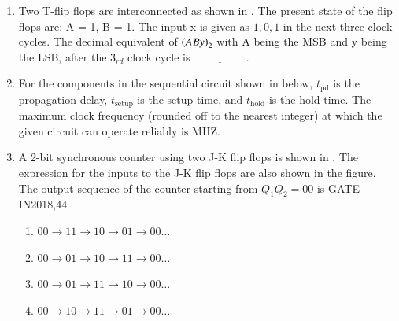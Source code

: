 \begin{enumerate}[label=\arabic*.,ref=\theenumi]
\item Two T-flip flops are interconnected as shown in 
	.
 The present state of the flip flops are: A = 1, B = 1. The input x is given as $1, 0, 1$ in the next three clock cycles. The decimal equivalent of $\left(ABy\right)_{2}$ with A being the MSB and y being the LSB, after the $3_{rd}$ clock cycle is $\underline{\hspace{2cm}}$.
\hfill{}
	\begin{figure}[H]
    \centering
    \resizebox{0.75\columnwidth}{!}{%

	}
    \caption{}
	\label{fig:GATEIN2020-40}
\end{figure}
%
\item For the components in the sequential circuit shown 
	in 
	below, $t_{\text{pd}}$ is the propagation delay, $t_{\text{setup}}$ is the setup time, and $t_{\text{hold}}$ is the hold time. The maximum clock frequency (rounded off to the nearest integer) at which the given circuit can operate reliably is \underline{\hspace{1cm}}MHZ.
\hfill{}

	\begin{figure}[H]
    \centering
    \resizebox{0.75\columnwidth}{!}{%

	}
    \caption{}
	\label{fig:GATEEC2020-50}
\end{figure}
%
\item A 2-bit synchronous counter using two J-K flip flops is shown
in .
 The expression for the inputs to the J-K flip flops are also shown in the figure. The output sequence of the counter starting from $Q_{1}Q_{2} = 00$ is
\hfill{GATE-IN2018,44}
\begin{figure}[H]
\centering
    \resizebox{0.75\columnwidth}{!}{%

	}
	\caption{}
\label{fig:gate_in_2018_44}
\end{figure}
%
\begin{enumerate}[label=\Alph*.]
\item $00 \rightarrow 11 \rightarrow 10 \rightarrow 01 \rightarrow 00 \hdots $
\item $00 \rightarrow 01 \rightarrow 10 \rightarrow 11 \rightarrow 00 \hdots $
\item $00 \rightarrow 01 \rightarrow 11 \rightarrow 10 \rightarrow 00 \hdots $
\item $00 \rightarrow 10 \rightarrow 11 \rightarrow 01 \rightarrow 00 \hdots $
\end{enumerate}


\end{enumerate}
